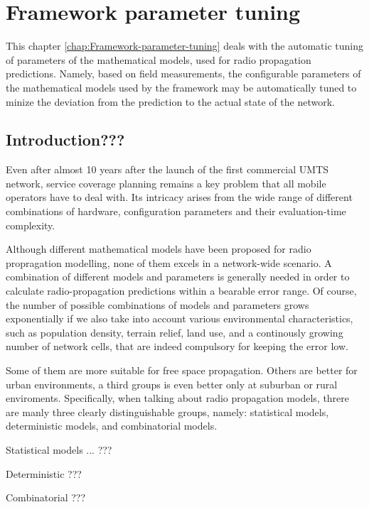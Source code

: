 
\chapter{Framework parameter tuning \label{chap:Framework-parameter-tuning}}


\noindent This chapter \ref{chap:Framework-parameter-tuning} deals
with the automatic tuning of parameters of the mathematical models,
used for radio propagation predictions. Namely, based on field measurements,
the configurable parameters of the mathematical models used by the
framework may be automatically tuned to minize the deviation from
the prediction to the actual state of the network.


\section{Introduction???}

Even after almost 10 years after the launch of the first commercial
UMTS network, service coverage planning remains a key problem that
all mobile operators have to deal with. Its intricacy arises from
the wide range of different combinations of hardware, configuration
parameters and their evaluation-time complexity. 

Although different mathematical models have been proposed for radio
propragation modelling, none of them excels in a network-wide scenario.
A combination of different models and parameters is generally needed
in order to calculate radio-propagation predictions within a bearable
error range. Of course, the number of possible combinations of models
and parameters grows exponentially if we also take into account various
environmental characteristics, such as population density, terrain
relief, land use, and a continously growing number of network cells,
that are indeed compulsory for keeping the error low.

Some of them are more suitable for free space propagation. Others
are better for urban environments, a third groups is even better only
at suburban or rural enviroments. Specifically, when talking about
radio propagation models, threre are manly three clearly distinguishable
groups, namely: statistical models, deterministic models, and combinatorial
models.

Statistical models ... ???

Deterministic ???

Combinatorial ???

